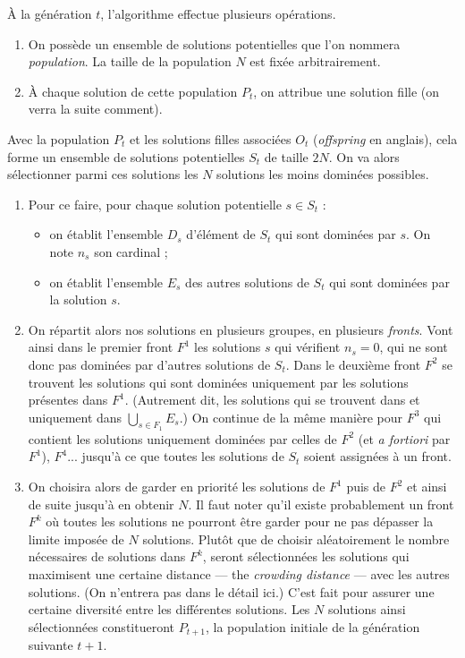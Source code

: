À la génération $t$, l'algorithme effectue plusieurs opérations.
\begin{enumerate}
 \item On possède un ensemble de solutions potentielles que l'on nommera \emph{population}.
 La taille de la population $N$ est fixée arbitrairement.
 \item À chaque solution de cette population $P_t$, on attribue une solution fille (on verra la suite comment). 
\end{enumerate}

 Avec la population $P_t$ et les solutions filles associées $O_t$ (\emph{offspring} en anglais), cela forme un ensemble de solutions potentielles $S_t$ de taille $2N$. 
 On va alors sélectionner parmi ces solutions les $N$ solutions les moins dominées possibles.
\begin{enumerate}[resume]
 \item Pour ce faire, pour chaque solution potentielle $s\in S_t$ :
 \begin{itemize}
  \item on établit l'ensemble $D_s$ d'élément de $S_t$ qui sont dominées par $s$. On note $n_s$ son cardinal ;
  \item on établit l'ensemble $E_s$ des autres solutions de $S_t$ qui sont dominées par la solution $s$.
 \end{itemize}
 \item On répartit alors nos solutions en plusieurs groupes, en plusieurs \emph{fronts}.
 Vont ainsi dans le premier front $F^1$ les solutions $s$ qui vérifient $n_s = 0$, qui ne sont donc pas dominées par d'autres solutions de $S_t$. 
 Dans le deuxième front $F^2$ se trouvent les solutions qui sont dominées uniquement par les solutions présentes dans $F^1$.
 (Autrement dit, les solutions qui se trouvent dans et uniquement dans $\bigcup_{s\in F_1} E_s$.)
 On continue de la même manière pour $F^3$ qui contient les solutions uniquement dominées par celles de $F^2$ (et \emph{a fortiori} par $F^1$), $F^4$... jusqu'à ce que toutes les solutions de $S_t$ soient assignées à un front.
 \item On choisira alors de garder en priorité les solutions de $F^1$ puis de $F^2$ et ainsi de suite jusqu'à en obtenir $N$. 
 Il faut noter qu'il existe probablement un front $F^k$ où toutes les solutions ne pourront être garder pour ne pas dépasser la limite imposée de $N$ solutions.
 Plutôt que de choisir aléatoirement le nombre nécessaires de solutions dans $F^k$, seront sélectionnées les solutions qui maximisent une certaine distance --- the \emph{crowding distance} --- avec les autres solutions.
 (On n'entrera pas dans le détail ici.)
 C'est fait pour assurer une certaine diversité entre les différentes solutions.
 Les $N$ solutions ainsi sélectionnées constitueront $P_{t+1}$, la population initiale de la génération suivante $t+1$.
\end{enumerate}

